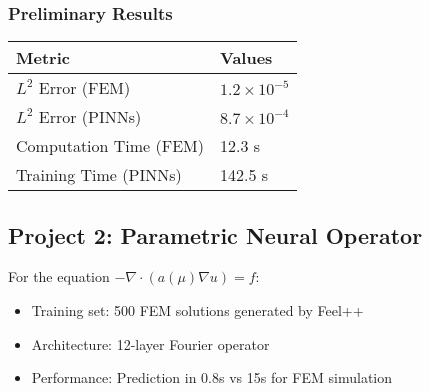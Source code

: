 \documentclass{article}
\begin{document}
\subsubsection{Preliminary Results}
\begin{tabularx}{\textwidth}{XX}
\toprule
\textbf{Metric} & \textbf{Values} \\
\midrule
\( L^2 \) Error (FEM) & \( 1.2 \times 10^{-5} \) \\
\( L^2 \) Error (PINNs) & \( 8.7 \times 10^{-4} \) \\
Computation Time (FEM) & 12.3 s \\
Training Time (PINNs) & 142.5 s \\
\bottomrule
\end{tabularx}

\subsection{Project 2: Parametric Neural Operator}
For the equation \( -\nabla\cdot(a(\mu)\nabla u) = f \):
\begin{itemize}
\item Training set: 500 FEM solutions generated by Feel++
\item Architecture: 12-layer Fourier operator
\item Performance: Prediction in 0.8s vs 15s for FEM simulation
\end{itemize}
\end{document}
